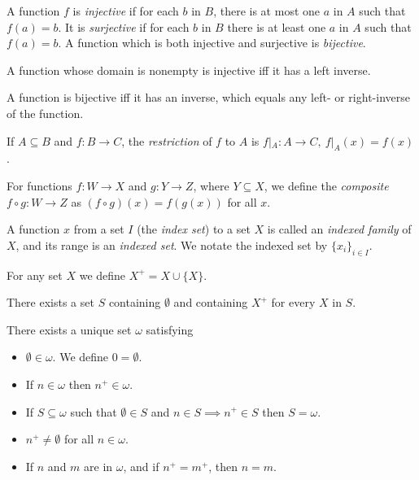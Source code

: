 \begin{defn}
  A function $f$ is \emph{injective} if for each $b$ in $B$, there is at most one
  $a$ in $A$ such that $f(a)=b$. It is \emph{surjective} if for each $b$ in
  $B$ there is at least one $a$ in $A$ such that $f(a)=b$. A function which is
  both injective and surjective is \emph{bijective}.
\end{defn}
\begin{prop}
  A function whose domain is nonempty is injective iff it has a left inverse.
\end{prop}
\begin{prop}
  A function is bijective iff it has an inverse, which equals any left- or
  right-inverse of the function.
\end{prop}
\begin{defn}
  If $A\subseteq B$ and $f:B\to C$, the \emph{restriction} of $f$ to $A$ is
  $f|_A:A\to C,\ f|_A(x)=f(x)$.
\end{defn}
\begin{defn}
  For functions $f:W\to X$ and $g:Y\to Z$, where $Y\subseteq X$, we define the
  \emph{composite} $f\circ g:W\to Z$ as $(f\circ g)(x)=f(g(x))$ for all $x$.
\end{defn}
\begin{defn}
  A function $x$ from a set $I$ (the \emph{index set}) to a set $X$ is called an
  \emph{indexed family} of $X$, and its range is an \emph{indexed set}. We
  notate the indexed set by $\{x_i\}_{i\in I}$.
\end{defn}
\begin{defn}
  For any set $X$ we define $X^+=X\cup\{X\}$.
\end{defn}
\begin{axiom}[Infinity]
  There exists a set $S$ containing $\emptyset$ and containing $X^+$ for
  every $X$ in $S$.
\end{axiom}
\begin{prop}
  There exists a unique set $\omega$ satisfying
  \begin{itemize}
    \item $\emptyset\in\omega$. We define $0=\emptyset$.
    \item If $n\in\omega$ then $n^+\in\omega$.
    \item If $S\subseteq\omega$ such that $\emptyset\in S$ and $n\in S\implies
      n^+\in S$ then $S=\omega$.
    \item $n^+\ne\emptyset$ for all $n\in \omega$.
    \item If $n$ and $m$ are in $\omega$, and if $n^+=m^+$, then $n=m$.
  \end{itemize}
\end{prop}
